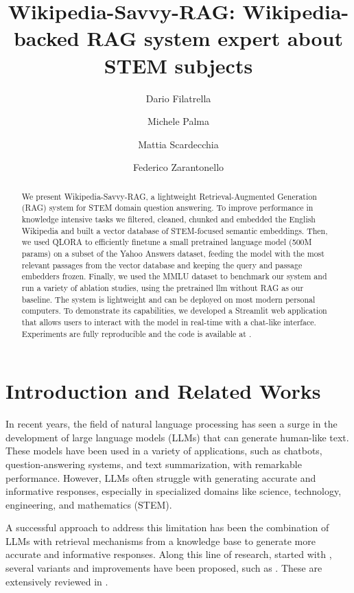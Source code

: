 \documentclass[11pt]{article}
\title{Wikipedia-Savvy-RAG: Wikipedia-backed RAG system expert about STEM subjects}
\author{Dario Filatrella \and Michele Palma \and Mattia Scardecchia \and Federico Zarantonello}
\begin{document}
\maketitle
\begin{abstract}
We present Wikipedia-Savvy-RAG, a lightweight Retrieval-Augmented Generation (RAG) system for
STEM domain question answering. To improve performance in knowledge intensive tasks we filtered, cleaned, 
chunked and embedded the English Wikipedia and built a vector database of STEM-focused semantic embeddings. 
Then, we used QLORA to efficiently finetune a small pretrained language model 
(500M params) on a subset of the Yahoo Answers dataset, feeding the model with the most relevant passages from the 
vector database and keeping the query and passage embedders frozen. Finally, we used the MMLU dataset to 
benchmark our system and run a variety of ablation studies, using the pretrained llm without RAG as our baseline.
The system is lightweight and can be deployed on most modern personal computers. To demonstrate its capabilities,
we developed a Streamlit web application that allows users to interact with the model in real-time with a chat-like interface.
Experiments are fully reproducible and the code is available at \cite{link_to_repo}.

\end{abstract}

\section{Introduction and Related Works}

In recent years, the field of natural language processing has seen a surge in
the development of large language models (LLMs) that can generate human-like text. \cite{gpt3}
These models have been used in a variety of applications, such as chatbots,
question-answering systems, and text summarization, with remarkable performance.  \cite{nlp_applications}
However, LLMs often struggle with generating accurate and informative responses, especially in specialized
domains like science, technology, engineering, and mathematics (STEM).  \cite{hallucinations_llm}

A successful approach to address this limitation has been the combination of LLMs with retrieval
mechanisms from a knowledge base to generate more accurate and informative responses.
Along this line of research, started with \cite{rag_paper}, several variants and improvements have been proposed,
such as \cite{replug} \cite{radit}. These are extensively reviewed in \cite{rag_survey}.
\end{document}
